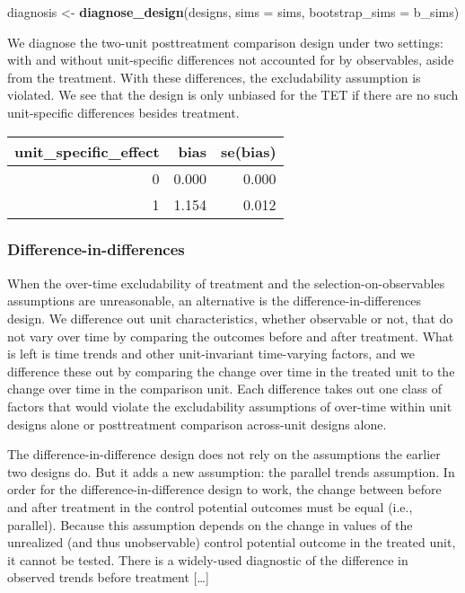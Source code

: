 \documentclass[
]{article}
\newenvironment{Shaded}{\begin{snugshade}}{\end{snugshade}}
\newcommand{\DataTypeTok}[1]{\textcolor[rgb]{0.13,0.29,0.53}{#1}}
\newcommand{\KeywordTok}[1]{\textcolor[rgb]{0.13,0.29,0.53}{\textbf{#1}}}
\newcommand{\NormalTok}[1]{#1}
\newcommand{\StringTok}[1]{\textcolor[rgb]{0.31,0.60,0.02}{#1}}
\begin{document}
\begin{Shaded}
\begin{Highlighting}[]
\NormalTok{diagnosis <-}\StringTok{ }\KeywordTok{diagnose_design}\NormalTok{(designs, }\DataTypeTok{sims =}\NormalTok{ sims, }\DataTypeTok{bootstrap_sims =}\NormalTok{ b_sims)}
\end{Highlighting}
\end{Shaded}

We diagnose the two-unit posttreatment comparison design under two
settings: with and without unit-specific differences not accounted for
by observables, aside from the treatment. With these differences, the
excludability assumption is violated. We see that the design is only
unbiased for the TET if there are no such unit-specific differences
besides treatment.

\begin{tabular}{rrr}
\toprule
unit\_specific\_effect & bias & se(bias)\\
\midrule
0 & 0.000 & 0.000\\
1 & 1.154 & 0.012\\
\bottomrule
\end{tabular}

\hypertarget{difference-in-differences}{%
\subsubsection{Difference-in-differences}\label{difference-in-differences}}

When the over-time excludability of treatment and the
selection-on-observables assumptions are unreasonable, an alternative is
the difference-in-differences design. We difference out unit
characteristics, whether observable or not, that do not vary over time
by comparing the outcomes before and after treatment. What is left is
time trends and other unit-invariant time-varying factors, and we
difference these out by comparing the change over time in the treated
unit to the change over time in the comparison unit. Each difference
takes out one class of factors that would violate the excludability
assumptions of over-time within unit designs alone or posttreatment
comparison across-unit designs alone.

The difference-in-difference design does not rely on the assumptions the
earlier two designs do. But it adds a new assumption: the parallel
trends assumption. In order for the difference-in-difference design to
work, the change between before and after treatment in the control
potential outcomes must be equal (i.e., parallel). Because this
assumption depends on the change in values of the unrealized (and thus
unobservable) control potential outcome in the treated unit, it cannot
be tested. There is a widely-used diagnostic of the difference in
observed trends before treatment {[}\ldots{]}
\end{document}
